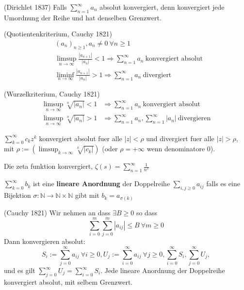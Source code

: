 \documentclass[8pt,a4paper,twocolumn]{extarticle}
\newcommand{\N}{\mathbb{N}}
\newcommand{\seq}[1]{\left( #1_n \right)_{n \ge 1}}
\begin{document}
\begin{satz}{2.52} (Dirichlet 1837)
    Falls $\sum_{n=1}^\infty a_n$ absolut konvergiert, denn konvergiert jede Umordnung der Reihe und hat denselben Grenzwert.
\end{satz}

\begin{satz}{2.53} (Quotientenkriterium, Cauchy 1821)
    \begin{align*}
        &\seq{a}, a_n \ne 0\ \forall n \ge 1\\
            &\limsup_{n \to \infty} \frac{|a_{n+1}|}{|a_n|} < 1 \Rightarrow \sum_{n=1}^\infty a_n\ \mbox{konvergiert absolut}\\
            &\liminf_{n \to \infty} \frac{|a_{n+1}|}{|a_n|} > 1 \Rightarrow \sum_{n=1}^\infty a_n\ \mbox{divergiert}
    \end{align*}
\end{satz}

\begin{satz}{2.56} (Wurzelkriterium, Cauchy 1821)
\begin{align*}
    \limsup_{n \to \infty} \sqrt[n]{|a_n|} < 1 &\Rightarrow \sum_{n=1}^\infty a_n\ \mbox{konvergiert absolut}\\
    \limsup_{n \to \infty} \sqrt[n]{|a_n|} > 1 &\Rightarrow \sum_{n=1}^\infty a_n, \sum_{n=1}^\infty |a_n|\ \mbox{divergieren}
\end{align*}
\end{satz}

\begin{korollar}{2.57}
    $\sum_{k=0}^\infty c_k z^k$ konvergiert absolut fuer alle $|z| < \rho$ und divergiert fuer alle $|z| > \rho$,
    mit $\rho := \left( \limsup_{k \to \infty} \sqrt[k]{|c_k|} \right)$ (oder $\rho = +\infty$ wenn denominatore 0).
\end{korollar}

\begin{korollar}{}
    Die zeta funktion konvergiert, $\zeta(s) = \sum_{n=1}^\infty \frac{1}{n^s}$
\end{korollar}

\begin{definition}{2.58}
    $\sum_{k=0}^\infty b_k$ ist eine \textbf{lineare Anordnung} der Doppelreihe $\sum_{i,j \ge 0} a_{ij}$ falls es
    eine Bijektion $\sigma : \N \to \N \times \N$ gibt mit $b_k = a_{\sigma(k)}$
\end{definition}

\begin{satz}{2.59} (Cauchy 1821)
    Wir nehmen an dass $\exists B \ge 0$ so dass
    \[ \sum_{i=0}^m \sum_{j=0}^m |a_{ij}| \le B\ \forall m \ge 0 \]
    Dann konvergieren absolut:
    \[
        S_i := \sum_{j=0}^\infty a_{ij}\ \forall i \ge 0,
        U_j := \sum_{i=0}^\infty a_{ij}\ \forall j \ge 0,
        \sum_{i=0}^\infty S_i,
        \sum_{j=0}^\infty U_j,
    \]
    und es gilt $\sum_{j=0}^\infty U_j = \sum_{i=0}^\infty S_i$.
    Jede lineare Anordnung der Doppelreihe konvergiert absolut, mit selbem Grenzwert.
\end{satz}
\end{document}
